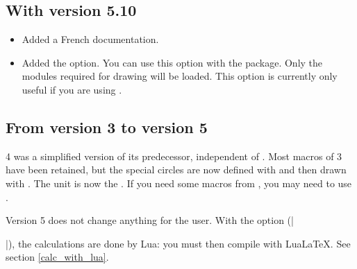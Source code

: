 \endgroup

\subsection{With version 5.10}
\begin{itemize}
  \item Added a French documentation.
  \item Added the  option. You can use this option with the  package. Only the modules required for drawing will be loaded. This option is currently only useful if you are using .
\end{itemize}

\subsection{From version 3 to version 5}

\tkzname{\tkznameofpack} 4 was a simplified version of its predecessor, independent of . Most macros of  3 have been retained, but the special circles are now defined with  and then drawn with . The unit is now the . If you need some macros from , you may need to use .

Version 5 does not change anything for the user. With the option  (|\usepackage[lua]{tkz-euclide}|), the calculations are done by Lua: you must then compile with LuaLaTeX. See section \ref{calc_with_lua}.



\endinput